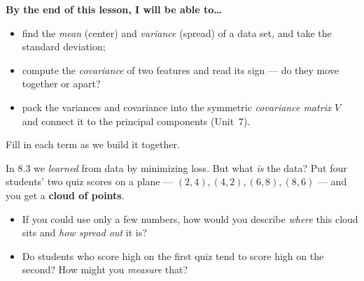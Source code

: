 \documentclass[10pt]{article}
\begin{document}
\namedateperiod

\vspace{0.12in}

\begin{objectivebox}
\textbf{By the end of this lesson, I will be able to\dots}
\begin{itemize}\setlength{\itemsep}{2pt}
  \item find the \emph{mean} (center) and \emph{variance} (spread) of a data set, and take the standard deviation;
  \item compute the \emph{covariance} of two features and read its sign --- do they move together or apart?
  \item pack the variances and covariance into the symmetric \emph{covariance matrix} $V$ and connect it to the principal components (Unit~7).
\end{itemize}
\end{objectivebox}

\vspace{0.06in}

\begin{vocabbox}
\small
Fill in each term as we build it together.
\vspace{2pt}
\end{vocabbox}

\begin{hookbox}
In 8.3 we \emph{learned} from data by minimizing loss. But what \emph{is} the data? Put four students' two quiz
scores on a plane --- $(2,4),(4,2),(6,8),(8,6)$ --- and you get a \textbf{cloud of points}.
\begin{itemize}\setlength{\itemsep}{1pt}
  \item If you could use only a few numbers, how would you describe \emph{where} this cloud sits and \emph{how spread out} it is? \writeline
  \item Do students who score high on the first quiz tend to score high on the second? How might you \emph{measure} that? \writeline
\end{itemize}
\end{hookbox}
\end{document}
